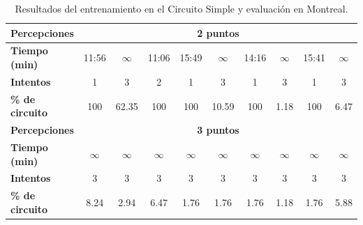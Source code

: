 \begin{table}[ht!]
\begin{tabular}{|l|c|c|c|c|c|c|c|c|c|}
\rowcolor[HTML]{EFEFEF} 
\textbf{Percepciones}                           & \multicolumn{9}{c|}{\cellcolor[HTML]{EFEFEF}\textbf{2 puntos}}                                                                                                                                        \\ \hline
\rowcolor[HTML]{FFFFFF} 
\cellcolor[HTML]{EFEFEF}\textbf{Tiempo (min)}            & 11:56        & $\infty$                        & 11:06       & 15:49        & $\infty$                       & 14:16       & $\infty$                     & 15:41      & $\infty$                     \\ \hline
\rowcolor[HTML]{FFFFFF} 
\cellcolor[HTML]{EFEFEF}\textbf{Intentos}                & 1            & 3                               & 2           & 1            & 3                              & 1           & 3                            & 1          & 3                            \\ \hline
\rowcolor[HTML]{32CB00} 
\cellcolor[HTML]{EFEFEF}\textbf{\% de circuito}          & 100          & \cellcolor[HTML]{FFC702}62.35   & 100         & 100          & \cellcolor[HTML]{FFC702}10.59  & 100         & \cellcolor[HTML]{FFC702}1.18 & 100        & \cellcolor[HTML]{FFC702}6.47 \\ \hline
\rowcolor[HTML]{EFEFEF} 
\textbf{Percepciones}                                    & \multicolumn{9}{c|}{\cellcolor[HTML]{EFEFEF}\textbf{3 puntos}}                                                                                                                                        \\ \hline
\rowcolor[HTML]{FFFFFF} 
\cellcolor[HTML]{EFEFEF}\textbf{Tiempo (min)}   & $\infty$     & $\infty$                        & $\infty$    & $\infty$     & $\infty$                       & $\infty$    & $\infty$                     & $\infty$   & $\infty$                     \\ \hline
\rowcolor[HTML]{FFFFFF} 
\cellcolor[HTML]{EFEFEF}\textbf{Intentos}       & 3            & 3                               & 3           & 3            & 3                              & 3           & 3                            & 3          & 3                            \\ \hline
\rowcolor[HTML]{FFC702} 
\cellcolor[HTML]{EFEFEF}\textbf{\% de circuito} & 8.24         & 2.94                            & 6.47        & 1.76         & 1.76                           & 1.76        & 1.18                         & 1.76       & 5.88                         \\ \hline
\end{tabular}
\caption{Resultados del entrenamiento en el Circuito Simple y evaluación en Montreal.}
\label{tab:entrenamiento-simple-evaluacion-montreal}
\end{table}

